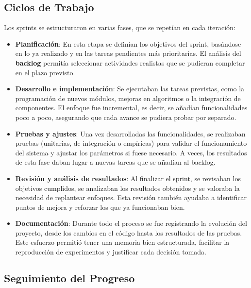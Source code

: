 \subsection{Ciclos de Trabajo}\label{subsec:ciclos-de-trabajo}
Los sprints se estructuraron en varias fases, que se repetían en cada iteración:

\begin{itemize}
    \item \textbf{Planificación}: En esta etapa se definían los objetivos del sprint, basándose en lo ya realizado y en
          las tareas pendientes más prioritarias.
          El análisis del \textbf{backlog} permitía seleccionar actividades realistas que se pudieran completar en el plazo
          previsto.

    \item \textbf{Desarrollo e implementación}: Se ejecutaban las tareas previstas, como la programación de nuevos
          módulos, mejoras en algoritmos o la integración de componentes.
          El enfoque fue incremental, es decir, se añadían funcionalidades poco a poco, asegurando que cada avance se pudiera
          probar por separado.

    \item \textbf{Pruebas y ajustes}: Una vez desarrolladas las funcionalidades, se realizaban pruebas (unitarias, de
          integración o empíricas) para validar el funcionamiento del sistema y ajustar los parámetros si fuese necesario.
          A veces, los resultados de esta fase daban lugar a nuevas tareas que se añadían al backlog.

    \item \textbf{Revisión y análisis de resultados}: Al finalizar el sprint, se revisaban los objetivos cumplidos, se
          analizaban los resultados obtenidos y se valoraba la necesidad de replantear enfoques.
          Esta revisión también ayudaba a identificar puntos de mejora y reforzar los que ya funcionaban bien.

    \item \textbf{Documentación}: Durante todo el proceso se fue registrando la evolución del proyecto, desde los
          cambios en el código hasta los resultados de las pruebas.
          Este esfuerzo permitió tener una memoria bien estructurada, facilitar la reproducción de experimentos y justificar cada
          decisión tomada.
\end{itemize}


\newpage
\subsection{Seguimiento del Progreso}\label{subsec:seguimiento-del-progreso}

